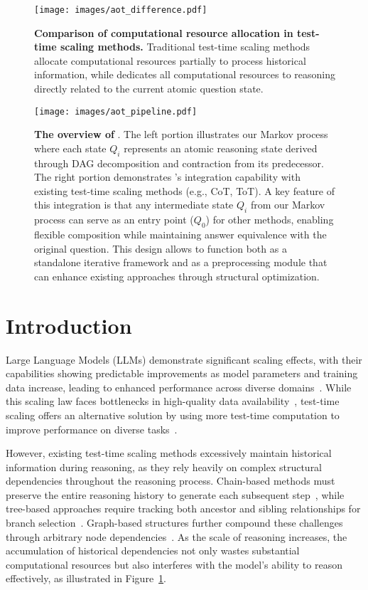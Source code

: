  \begin{figure}[!t]
    \centering
    \texttt{[image: images/aot\_difference.pdf]} 
    \caption{\textbf{Comparison of computational resource allocation in test-time scaling methods.} Traditional test-time scaling methods allocate computational resources partially to process historical information, while \our dedicates all computational resources to reasoning directly related to the current atomic question state.}
    \label{fig:difference}
\end{figure}


\begin{figure*}[t!]
    \centering
    \texttt{[image: images/aot\_pipeline.pdf]} 
    \caption{\textbf{The overview of \our}. The left portion illustrates our Markov process where each state $Q_i$ represents an atomic reasoning state derived through DAG decomposition and contraction from its predecessor. The right portion demonstrates \our's integration capability with existing test-time scaling methods (e.g., CoT, ToT). A key feature of this integration is that any intermediate state $Q_i$ from our Markov process can serve as an entry point ($Q_0$) for other methods, enabling flexible composition while maintaining answer equivalence with the original question. This design allows \our to function both as a standalone iterative framework and as a preprocessing module that can enhance existing approaches through structural optimization.}
    \label{fig:pipeline}
\end{figure*}

\section{Introduction}

Large Language Models (LLMs) demonstrate significant scaling effects, with their capabilities showing predictable improvements as model parameters and training data increase, leading to enhanced performance across diverse domains~\cite{Kaplan2020scaling}. While this scaling law faces bottlenecks in high-quality data availability~\cite{Villalobos2024Will}, test-time scaling offers an alternative solution by using more test-time computation to improve performance on diverse tasks~\cite{Snell2024ScalingLT, muennighoff2025s1, hou2025advancing}.

However, existing test-time scaling methods excessively maintain historical information during reasoning, as they rely heavily on complex structural dependencies throughout the reasoning process. Chain-based methods must preserve the entire reasoning history to generate each subsequent step~\cite{Wei2022cot, Zhang2024autocot}, while tree-based approaches require tracking both ancestor and sibling relationships for branch selection~\cite{Yao2023tot, Zhou2024lats, Ding2023xot}. Graph-based structures further compound these challenges through arbitrary node dependencies~\cite{Besta2024got, Zhang2024dot}. As the scale of reasoning increases, the accumulation of historical dependencies not only wastes substantial computational resources but also interferes with the model's ability to reason effectively, as illustrated in Figure~\ref{fig:difference}.


